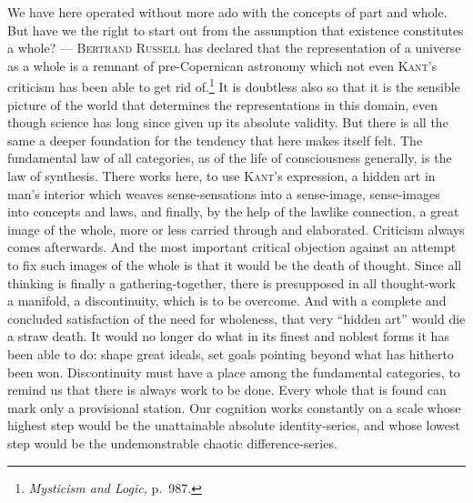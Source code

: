 \documentclass[12pt]{book}
\newcommand{\opage}[1]{\marginnote{\footnotesize\textit{[#1]}}}
\begin{document}
We have here operated without more ado with the concepts of part and whole. But
have we the right to start out from the assumption that existence constitutes a
whole? --- \textsc{Bertrand Russell} has declared that the representation of a
universe as a whole is a remnant of pre-Copernican astronomy which not even
\textsc{Kant}'s criticism has been able to get rid of.\footnote{\textit{Mysticism
and Logic,} p.\ 987.} It is doubtless also so that it is the sensible picture of
the world that determines the representations \opage{126}in this domain, even though science
has long since given up its absolute validity. But there is all the same a deeper
foundation for the tendency that here makes itself felt. The fundamental law of
all categories, as of the life of consciousness generally, is the law of
synthesis. There works here, to use \textsc{Kant}'s expression, a hidden art in
man's interior which weaves sense-sensations into a sense-image, sense-images into
concepts and laws, and finally, by the help of the lawlike connection, a great
image of the whole, more or less carried through and elaborated. Criticism always
comes afterwards. And the most important critical objection against an attempt to
fix such images of the whole is that it would be the death of thought. Since all
thinking is finally a gathering-together, there is presupposed in all thought-work
a manifold, a discontinuity, which is to be overcome. And with a complete and
concluded satisfaction of the need for wholeness, that very ``hidden art'' would
die a straw death. It would no longer do what in its finest and noblest forms it
has been able to do: shape great ideals, set goals pointing beyond what has
hitherto been won. Discontinuity must have a place among the fundamental
categories, to remind us that there is always work to be done. Every whole that is
found can mark only a provisional station. Our cognition works constantly on a
scale whose highest step would be the unattainable absolute identity-series, and
whose lowest step would be the undemonstrable chaotic difference-series.
\end{document}
